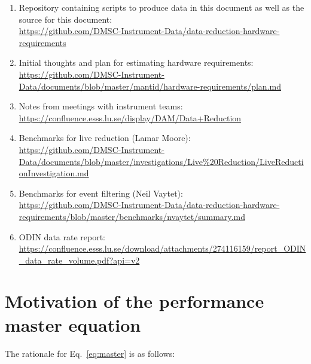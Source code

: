 \documentclass[a4paper,english,numbers=noenddot,bibliography=totoc,chapterprefix=on,DIV=12]{scrartcl}
\newcommand{\odin}{ODIN\xspace}
\begin{document}
\begin{enumerate}
  \item Repository containing scripts to produce data in this document as well as the source for this document:\\
    \url{https://github.com/DMSC-Instrument-Data/data-reduction-hardware-requirements}
  \item Initial thoughts and plan for estimating hardware requirements:\\
    \url{https://github.com/DMSC-Instrument-Data/documents/blob/master/mantid/hardware-requirements/plan.md}
  \item Notes from meetings with instrument teams:\\
    \url{https://confluence.esss.lu.se/display/DAM/Data+Reduction}
  \item Benchmarks for live reduction (Lamar Moore):\\
    \url{https://github.com/DMSC-Instrument-Data/documents/blob/master/investigations/Live%20Reduction/LiveReductionInvestigation.md}
  \item Benchmarks for event filtering (Neil Vaytet):\\
    \url{https://github.com/DMSC-Instrument-Data/data-reduction-hardware-requirements/blob/master/benchmarks/nvaytet/summary.md}
  \item \odin data rate report:\\
    \url{https://confluence.esss.lu.se/download/attachments/274116159/report_ODIN_data_rate_volume.pdf?api=v2}
\end{enumerate}




\section{Motivation of the performance master equation}
\label{app:master_eq}

The rationale for Eq.~\eqref{eq:master} is as follows:
\end{document}
